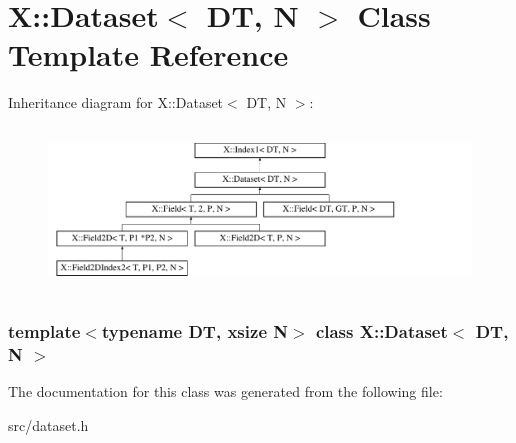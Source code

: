 \hypertarget{class_x_1_1_dataset}{\section{X\-:\-:Dataset$<$ D\-T, N $>$ Class Template Reference}
\label{class_x_1_1_dataset}
}
Inheritance diagram for X\-:\-:Dataset$<$ D\-T, N $>$\-:\begin{figure}[H]
\begin{center}
\leavevmode
\includegraphics[height=4.381846cm]{class_x_1_1_dataset}
\end{center}
\end{figure}
\subsubsection*{template$<$typename D\-T, xsize N$>$ class X\-::\-Dataset$<$ D\-T, N $>$}



The documentation for this class was generated from the following file\-:\begin{DoxyCompactItemize}
\item 
src/dataset.\-h\end{DoxyCompactItemize}
